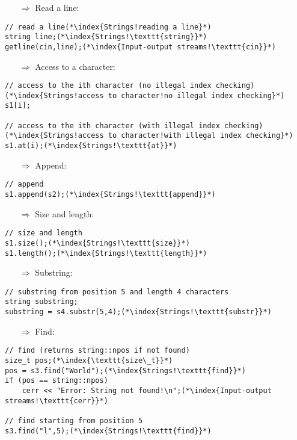 \documentclass[10pt]{article}
\begin{document}
\begin{enumerate}
\item[$\Rightarrow$] Read a line:
\end{enumerate}
\begin{lstlisting}
// read a line(*\index{Strings!reading a line}*)
string line;(*\index{Strings!\texttt{string}}*)
getline(cin,line);(*\index{Input-output streams!\texttt{cin}}*)
\end{lstlisting}
\begin{enumerate}
\item[$\Rightarrow$] Access to a character:
\end{enumerate}
\begin{lstlisting}
// access to the ith character (no illegal index checking)(*\index{Strings!access to character!no illegal index checking}*)
s1[i];

// access to the ith character (with illegal index checking)(*\index{Strings!access to character!with illegal index checking}*)
s1.at(i);(*\index{Strings!\texttt{at}}*)
\end{lstlisting}
\begin{enumerate}
\item[$\Rightarrow$] Append:
\end{enumerate}
\begin{lstlisting}
// append
s1.append(s2);(*\index{Strings!\texttt{append}}*)
\end{lstlisting}
\begin{enumerate}
\item[$\Rightarrow$] Size and length:
\end{enumerate}
\begin{lstlisting}
// size and length
s1.size();(*\index{Strings!\texttt{size}}*)
s1.length();(*\index{Strings!\texttt{length}}*)
\end{lstlisting}
\begin{enumerate}
\item[$\Rightarrow$] Substring:
\end{enumerate}
\begin{lstlisting}
// substring from position 5 and length 4 characters
string substring;
substring = s4.substr(5,4);(*\index{Strings!\texttt{substr}}*)
\end{lstlisting}
\begin{enumerate}
\item[$\Rightarrow$] Find:
\end{enumerate}
\begin{lstlisting}
// find (returns string::npos if not found)
size_t pos;(*\index{\texttt{size\_t}}*)
pos = s3.find("World");(*\index{Strings!\texttt{find}}*)
if (pos == string::npos)
    cerr << "Error: String not found!\n";(*\index{Input-output streams!\texttt{cerr}}*)

// find starting from position 5
s3.find("l",5);(*\index{Strings!\texttt{find}}*)
\end{lstlisting}
\end{document}
